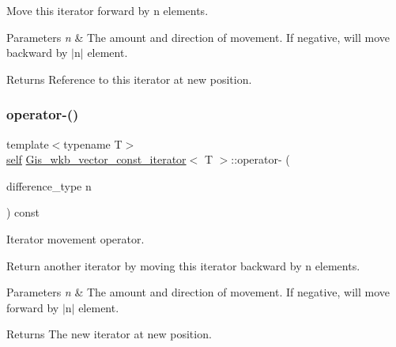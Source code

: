 Move this iterator forward by n elements. 


\begin{DoxyParams}{Parameters}
{\em n} & The amount and direction of movement. If negative, will move backward by $\vert$n$\vert$ element. \\
\hline
\end{DoxyParams}
\begin{DoxyReturn}{Returns}
Reference to this iterator at new position. 
\end{DoxyReturn}
\mbox{\label{classGis__wkb__vector__const__iterator_ae63bd3cedff9cb57e5d6c45cb5ef4dff}} 
\subsubsection{\texorpdfstring{operator-\/()}{operator-()}\hspace{0.1cm}{\footnotesize\ttfamily [1/2]}}
{\footnotesize\ttfamily template$<$typename T$>$ \\
\mbox{\hyperlink{classGis__wkb__vector__const__iterator}{self}} \mbox{\hyperlink{classGis__wkb__vector__const__iterator}{Gis\+\_\+wkb\+\_\+vector\+\_\+const\+\_\+iterator}}$<$ T $>$\+::operator-\/ (\begin{DoxyParamCaption}\item[{difference\+\_\+type}]{n }\end{DoxyParamCaption}) const\hspace{0.3cm}{\ttfamily [inline]}}



Iterator movement operator. 

Return another iterator by moving this iterator backward by n elements. 
\begin{DoxyParams}{Parameters}
{\em n} & The amount and direction of movement. If negative, will move forward by $\vert$n$\vert$ element. \\
\hline
\end{DoxyParams}
\begin{DoxyReturn}{Returns}
The new iterator at new position. 
\end{DoxyReturn}
\mbox{\label{classGis__wkb__vector__const__iterator_a9662de5243a456cb63a183214deba0af}} 
